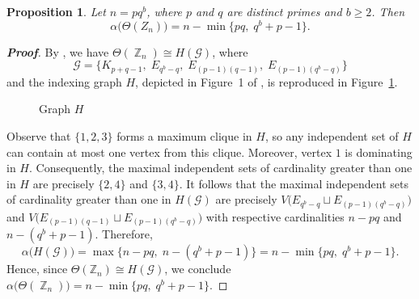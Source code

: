 \documentclass{amsart}
\theoremstyle{plain}
\newtheorem{proposition}[theorem]{Proposition}
\theoremstyle{definition}
\DeclareMathOperator{\Z}{\mathbb{Z}}
\begin{document}
\begin{proposition}\label{pr_ind-no-cyclic-grup-order-pqb}
Let $n=pq^{b}$, where $p$ and $q$ are distinct primes and $b\geq 2$. Then \[\alpha\bigl(\Theta(Z_n)\bigr)= n- \min\bigl\{pq,\; q^{b}+p-1\bigr\}.\]
\end{proposition}

\begin{proof}[\textbf{Proof}]
By \cite[Proposition~3.3]{shubh-arxiv25}, we have $\Theta(\Z_n)\cong H(\mathcal{G})$, where \[\mathcal{G} = \bigl\{ K_{p+q-1},\; E_{q^{b}-q},\; E_{(p-1)(q-1)},\; E_{(p-1)(q^{b}-q)} \bigr\}\]
and the indexing graph $H$, depicted in Figure~1 of \cite{shubh-arxiv25}, is reproduced in Figure~\ref{graph-H-of-cyclic-pqm}.  

\begin{figure}[h]
	\caption{Graph $H$}	\label{graph-H-of-cyclic-pqm}
\end{figure}

Observe that $\{1,2,3\}$ forms a maximum clique in $H$, so any independent set of $H$ can contain at most one vertex from this clique. Moreover, vertex $1$ is dominating in $H$. Consequently, the maximal independent sets of cardinality greater than one in $H$ are  precisely $\{2,4\}$ and $\{3,4\}$. It follows that the maximal independent sets of cardinality greater than one in $H(\mathcal{G})$ are precisely
$V\bigl(E_{q^{b}-q} \sqcup E_{(p-1)(q^{b}-q)}\bigr)$ and $V\bigl(E_{(p-1)(q-1)} \sqcup E_{(p-1)(q^{b}-q)}\bigr)$ with respective cardinalities $n-pq$ and $n-(q^{b}+p-1)$.
Therefore,
\[\alpha\bigl(H(\mathcal{G})\bigr)
=\max\bigl\{n-pq,\; n-(q^{b}+p-1)\bigr\} = n- \min\bigl\{pq,\; q^{b}+p-1\bigr\}.\]
Hence, since $\Theta(\mathbb{Z}_{n})\cong H(\mathcal{G})$, we conclude
$\alpha\bigl(\Theta(\Z_n)\bigr) = n- \min\bigl\{pq,\; q^{b}+p-1\bigr\}$.
\end{proof}
\end{document}
